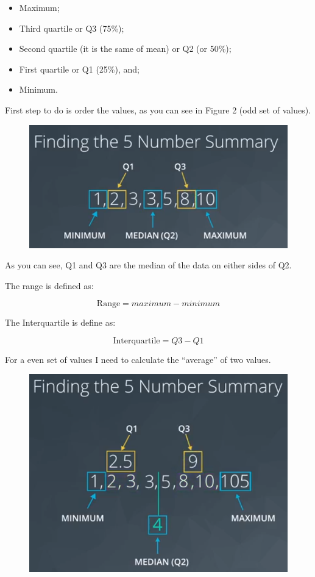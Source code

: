 \documentclass[]{book}
\providecommand{\tightlist}{%
  \setlength{\itemsep}{0pt}\setlength{\parskip}{0pt}}
\begin{document}
\begin{itemize}
\tightlist
\item
  Maximum;
\item
  Third quartile or Q3 (75\%);
\item
  Second quartile (it is the same of mean) or Q2 (or 50\%);
\item
  First quartile or Q1 (25\%), and;
\item
  Minimum.
\end{itemize}

First step to do is order the values, as you can see in Figure 2 (odd
set of values).

\begin{figure}
\centering
\includegraphics{01-img/c4_l2_02.png}
\caption{}
\end{figure}

As you can see, Q1 and Q3 are the median of the data on either sides of
Q2.

The range is defined as:

\[ \text{Range} = maximum - minimum \tag{1}\]

The Interquartile is define as:

\[ \text{Interquartile} = Q3 - Q1 \tag{2}\]

For a even set of values I need to calculate the ``average'' of two
values.

\begin{figure}
\centering
\includegraphics{01-img/c4_l2_03.png}
\caption{}
\end{figure}
\end{document}
